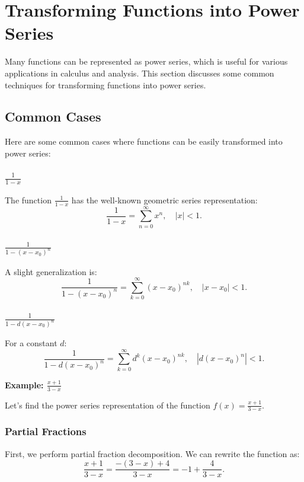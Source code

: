 \newpage
\section{Transforming Functions into Power Series}

Many functions can be represented as power series, which is useful for various applications in calculus and analysis. This section discusses some common techniques for transforming functions into power series.

\subsection{Common Cases}
Here are some common cases where functions can be easily transformed into power series:

\subsubsection{\(\frac{1}{1 - x}\)}
The function \(\frac{1}{1 - x}\) has the well-known geometric series representation:
\[
\frac{1}{1 - x} = \sum_{n=0}^{\infty} x^n, \quad |x| < 1.
\]

\subsubsection{\(\frac{1}{1 - (x - x_0)^n}\)}
A slight generalization is:
\[
\frac{1}{1 - (x - x_0)^n} = \sum_{k=0}^{\infty} (x - x_0)^{nk}, \quad |x - x_0| < 1.
\]

\subsubsection{\(\frac{1}{1 - d(x - x_0)^n}\)}
For a constant \(d\):
\[
\frac{1}{1 - d(x - x_0)^n} = \sum_{k=0}^{\infty} d^k (x - x_0)^{nk}, \quad |d(x - x_0)^n| < 1.
\]

\textbf{Example: \(\frac{x + 1}{3 - x}\)}

Let's find the power series representation of the function \(f(x) = \frac{x + 1}{3 - x}\).

\subsubsection{Partial Fractions}

First, we perform partial fraction decomposition. We can rewrite the function as:
\[
\frac{x + 1}{3 - x} = \frac{-(3 - x) + 4}{3 - x} = -1 + \frac{4}{3 - x}.
\]

